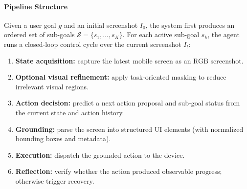 \paragraph{Pipeline Structure}
Given a user goal $g$ and an initial screenshot $I_0$, the system first produces an ordered set of sub-goals $\mathcal{S}=\{s_1,\dots,s_K\}$. For each active sub-goal $s_k$, the agent runs a closed-loop control cycle over the current screenshot $I_t$:
\begin{enumerate}
    \item \textbf{State acquisition:} capture the latest mobile screen as an RGB screenshot.
    \item \textbf{Optional visual refinement:} apply task-oriented masking to reduce irrelevant visual regions.
    \item \textbf{Action decision:} predict a next action proposal and sub-goal status from the current state and action history.
    \item \textbf{Grounding:} parse the screen into structured UI elements (with normalized bounding boxes and metadata).
    \item \textbf{Execution:} dispatch the grounded action to the device.
    \item \textbf{Reflection:} verify whether the action produced observable progress; otherwise trigger recovery.
\end{enumerate}


